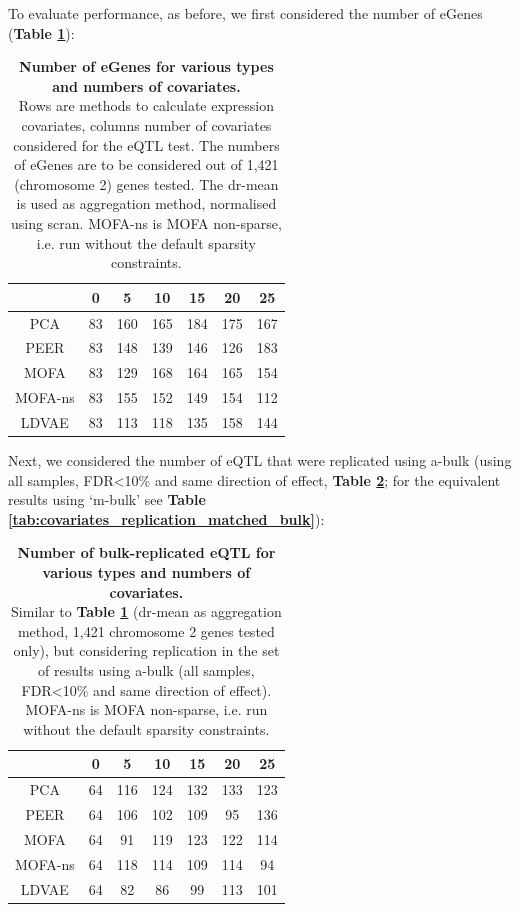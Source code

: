To evaluate performance, as before, we first considered the number of eGenes (\textbf{Table \ref{tab:covariates}}):

\begin{table}[h]
    \centering
    \begin{tabular}{c|c c c c c c}
    &          0 & 5 & 10 & 15 & 20 & 25  \\
    \hline
    PCA      & 83 & 160 & 165 & 184 & 175 & 167 \\
    PEER     & 83 & 148 & 139 & 146 & 126 & 183 \\
    MOFA     & 83 & 129 & 168 & 164 & 165 & 154 \\
    MOFA-ns  & 83 & 155 & 152 & 149 & 154 & 112 \\
    LDVAE    & 83 & 113 & 118 & 135 & 158 & 144 \\
    \end{tabular}
    \caption[Number and type of covariate comparison]{\textbf{Number of eGenes for various types and numbers of covariates.}\\
    Rows are methods to calculate expression covariates, columns number of covariates considered for the eQTL test.
    The numbers of eGenes are to be considered out of 1,421 (chromosome 2) genes tested.
    The dr-mean is used as aggregation method, normalised using scran.
    MOFA-ns is MOFA non-sparse, i.e. run without the default sparsity constraints.}
    \label{tab:covariates}
\end{table}

Next, we considered the number of eQTL that were replicated using a-bulk (using all samples, FDR<10\% and same direction of effect, \textbf{Table \ref{tab:covariates_replication}}; for the equivalent results using `m-bulk' see \textbf{Table \ref{tab:covariates_replication_matched_bulk}}):

\begin{table}[h]
    \centering
    \begin{tabular}{c|c c c c c c}
    &          0 & 5 & 10 & 15 & 20 & 25  \\
    \hline
    PCA      & 64 & 116 & 124 & 132 & 133 & 123 \\
    PEER     & 64 & 106 & 102 & 109 &  95 & 136 \\
    MOFA     & 64 &  91 & 119 & 123 & 122 & 114 \\
    MOFA-ns  & 64 & 118 & 114 & 109 & 114 &  94 \\
    LDVAE    & 64 &  82 &  86 &  99 & 113 & 101 \\
    \end{tabular}
    \caption[Covariate comparison in terms of replication of bulk results]{\textbf{Number of bulk-replicated eQTL for various types and numbers of covariates.} \\
    Similar to \textbf{Table \ref{tab:covariates}} (dr-mean as aggregation method, 1,421 chromosome 2 genes tested only), but considering replication in the set of results using a-bulk (all samples, FDR<10\% and same direction of effect).
    MOFA-ns is MOFA non-sparse, i.e. run without the default sparsity constraints.}
    \label{tab:covariates_replication}
\end{table}

